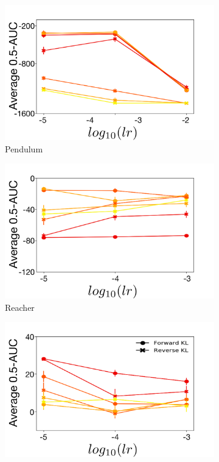 \documentclass{article}
\begin{document}
\begin{figure}[!ht]
  \centering
  \begin{subfigure}[b]{0.3\linewidth}
    \centering
    \includegraphics[width=\columnwidth]{figs/deep/continuous/PD_qv_ss.pdf} 
    \caption{Pendulum
    }\label{fig:pendulum-pi}
  \end{subfigure}%
  \begin{subfigure}[b]{0.3\linewidth}
    \centering
    \includegraphics[width=\columnwidth]{figs/deep/continuous/Reacher_qv_ss.pdf} 
    \caption{Reacher
    }\label{fig:reacher-pi}
  \end{subfigure}%
  \begin{subfigure}[b]{0.3\linewidth}
    \centering
    \includegraphics[width=\columnwidth]{figs/deep/continuous/Swimmer_qv_ss.pdf} 

\end{subfigure}
\end{figure}
\end{document}
